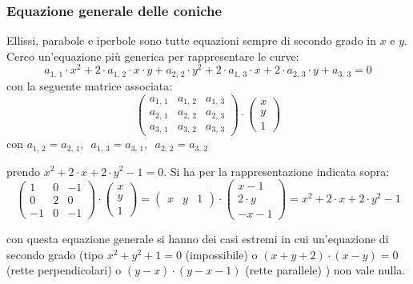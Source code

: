 \documentclass[a4paper,12pt, oneside]{book}
\begin{document}
\subsubsection{Equazione generale delle coniche}
Ellissi, parabole e iperbole sono tutte equazioni sempre di secondo grado in $x$ e $y$. Cerco un'equazione più generica per rappresentare le curve:
$$a_{1,\,1}\cdot x^2+2\cdot a_{1,\,2}\cdot x\cdot y+a_{2,\,2}\cdot y^2+2\cdot a_{1,\,3}\cdot x+2\cdot a_{2,\,3}\cdot y+a_{3,\,3}=0$$
con la seguente matrice associata:
$$
\left(\begin{matrix}
a_{1,\,1} & a_{1,\,2} & a_{1,\,3}\\
a_{2,\,1} & a_{2,\,2} & a_{2,\,3}\\
a_{3,\,1} & a_{3,\,2} & a_{3,\,3}
\end{matrix}\right)\cdot
\left(\begin{matrix}
x\\
y\\
1
\end{matrix}\right)
$$
con $a_{1,\,2}=a_{2,\,1},\,\,\, a_{1,\,3}=a_{3,\,1},\,\,\,a_{2,\,2}=a_{3,\,2}$
\begin{esempio}
prendo $x^2+2\cdot x+2\cdot y^2-1=0$. Si ha per la rappresentazione indicata sopra:
$$
\left(\begin{matrix}
1 & 0 & -1\\
0 & 2 & 0\\
-1 & 0 & -1
\end{matrix}\right)\cdot
\left(\begin{matrix}
x\\
y\\
1
\end{matrix}\right)=\left(\begin{matrix}
x & y & 1
\end{matrix}\right)\cdot\left(\begin{matrix}
x-1\\
2\cdot y\\
-x-1
\end{matrix}\right)=x^2+2\cdot x+2\cdot y^2-1
$$
\end{esempio}

con questa equazione generale si hanno dei casi estremi in cui un'equazione di secondo grado (tipo $x^2+y^2+1=0$ (impossibile) o $(x+y+2)\cdot(x-y)=0$ (rette perpendicolari) o $(y-x)\cdot (y-x-1)$ (rette parallele) ) non vale nulla.
\newpage
\end{document}
